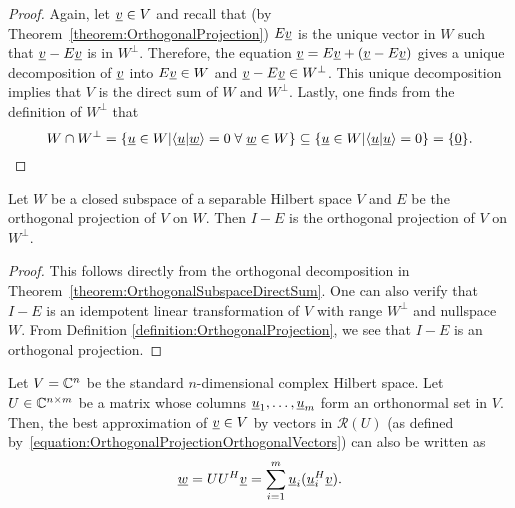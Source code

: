 \begin{proof}
Again, let $\underline{v} \in V$ and recall that (by Theorem~\ref{theorem:OrthogonalProjection}) $E \underline{v}$ is the unique vector in $W$ such that $\underline{v} - E \underline{v}$ is in $W^{\bot}$.
Therefore, the equation $\underline{v} = E \underline{v} + \left( \underline{v} - E \underline{v} \right)$ gives a unique decomposition of $\underline{v}$ into $E \underline{v} \in W$ and $\underline{v} - E \underline{v} \in W^{\bot}$.
This unique decomposition implies that $V$ is the direct sum of $W$ and $W^{\bot}$.
Lastly, one finds from the definition of $W^{\bot}$ that
\[W \cap W^{\bot} = \left\{ \underline{u} \in W | \langle \underline{u} | \underline{w} \rangle =0 \; \forall \; \underline{w}\in W \right\}  \subseteq \left\{ \underline{u} \in W | \langle \underline{u} | \underline{u} \rangle =0 \right\}  = \{ \underline{0} \} . \qedhere \]
\end{proof}

\begin{corollary}
Let $W$ be a closed subspace of a separable Hilbert space $V$ and $E$ be the orthogonal projection of $V$ on $W$.
Then $I - E$ is the orthogonal projection of $V$ on $W^{\bot}$.
\end{corollary}
\begin{proof}
This follows directly from the orthogonal decomposition in Theorem~\ref{theorem:OrthogonalSubspaceDirectSum}.
One can also verify that $I-E$ is an idempotent linear transformation of $V$ with range $W^{\bot}$ and nullspace $W$.
From Definition \ref{definition:OrthogonalProjection}, we see that $I-E$ is an orthogonal projection.
\end{proof}

\begin{example}
Let $V = \mathbb{C}^n$ be the standard $n$-dimensional complex Hilbert space.
Let $U \in \mathbb{C}^{n\times m}$ be a matrix whose columns $\underline{u}_1,\ldots,\underline{u}_m$ form an orthonormal set in $V$.
Then, the best approximation of $\underline{v}\in V$ by vectors in $\mathcal{R}(U)$ (as  defined by~\eqref{equation:OrthogonalProjectionOrthogonalVectors}) can also be written as
\[ \underline{w} = U U^H \underline{v} = \sum_{i=1}^m \underline{u}_i (\underline{u}_i^H \underline{v}). \]
\end{example}



